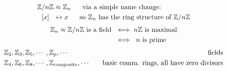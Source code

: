\begin{align}
    {\mathbb{Z}}/n{\mathbb{Z}} &\approx {\mathbb{Z}}_n \ \ \ \ \text{    via a simple name change:} \nonumber \\
    [x] \ \ &\leftrightarrow x \ \ \ \ \text{    so }{\mathbb{Z}}_n \text{ has the ring structure of }{\mathbb{Z}}/n{\mathbb{Z}} \nonumber
\end{align}
\begin{align}
    {\mathbb{Z}}_n \approx {\mathbb{Z}}/n{\mathbb{Z}} \text{ is a field } &\iff n{\mathbb{Z}} \text{ is maximal} \nonumber \\
    &\iff \ n \text{ is prime} \nonumber
\end{align}
\begin{align}
    &\Z_2, \Z_3, \Z_5, \cdots , \Z_p, \cdots \ \ &\text{ fields}\nonumber \\
    &\Z_4, \Z_6, \Z_8, \cdots , \Z_{\text{composite}}, \cdots \ \ &\text{ basic comm. rings, all have zero divisors} \nonumber
\end{align}
